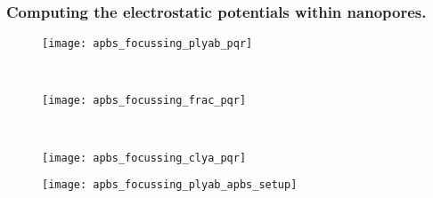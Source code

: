 \subsubsection{Computing the electrostatic potentials within nanopores.}
%

\begin{figure*}[p]
  \centering
  \medskip
  \begin{minipage}[t]{50mm}
    \centering
    \begin{subfigure}[t]{50mm}
      \centering
      \caption{}\vspace{-5mm}\hspace{1.5mm}\label{fig:apbs_focussing_plyab_pqr}
      \texttt{[image: apbs\_focussing\_plyab\_pqr]}
    \end{subfigure}
    \\ \vspace{2mm}
    \centering
    \begin{subfigure}[t]{50mm}
      \centering
      \caption{}\vspace{-5mm}\hspace{1.5mm}\label{fig:apbs_focussing_frac_pqr}
      \texttt{[image: apbs\_focussing\_frac\_pqr]}
    \end{subfigure}
    \\ \vspace{2mm}
    \centering
    \begin{subfigure}[t]{50mm}
      \centering
      \caption{}\vspace{-5mm}\hspace{1.5mm}\label{fig:apbs_focussing_clya_pqr}
      \texttt{[image: apbs\_focussing\_clya\_pqr]}
    \end{subfigure}
  \end{minipage}
  \hspace{2mm}
  \begin{minipage}[t]{55mm}
    \centering
    \begin{subfigure}[t]{55mm}
      \centering
      \caption{}\vspace{-5mm}\hspace{1.5mm}\label{fig:apbs_focussing_plyab_apbs_setup}
      \texttt{[image: apbs\_focussing\_plyab\_apbs\_setup]}
    \end{subfigure}
    \\ \vspace{2mm}
    \begin{subfigure}[t]{55mm}

\end{subfigure}
\end{minipage}
\end{figure*}
